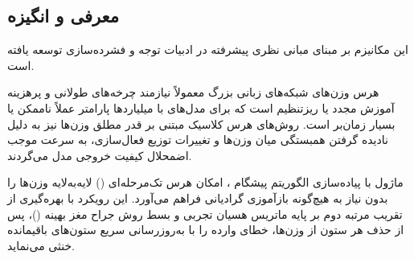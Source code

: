 \subsection{معرفی و انگیزه}
این مکانیزم بر مبنای مبانی نظری پیشرفته در ادبیات توجه و فشرده‌سازی \cite{frantar2023sparsegpt} توسعه یافته است.

هرس وزن‌های شبکه‌های زبانی بزرگ معمولاً نیازمند چرخه‌های طولانی و پرهزینه آموزش مجدد یا ریزتنظیم است که برای مدل‌های با میلیاردها پارامتر عملاً ناممکن یا بسیار زمان‌بر است. روش‌های هرس کلاسیک مبتنی بر قدر مطلق وزن‌ها نیز به دلیل نادیده گرفتن همبستگی میان وزن‌ها و تغییرات توزیع فعال‌سازی، به سرعت موجب اضمحلال کیفیت خروجی مدل می‌گردند.

ماژول  با پیاده‌سازی الگوریتم پیشگام ، امکان هرس تک‌مرحله‌ای () لایه‌به‌لایه وزن‌ها را بدون نیاز به هیچ‌گونه بازآموزی گرادیانی فراهم می‌آورد. این رویکرد با بهره‌گیری از تقریب مرتبه دوم بر پایه ماتریس هسیان تجربی و بسط روش جراح مغز بهینه ()، پس از حذف هر ستون از وزن‌ها، خطای وارده را با به‌روزرسانی سریع ستون‌های باقیمانده خنثی می‌نماید.
